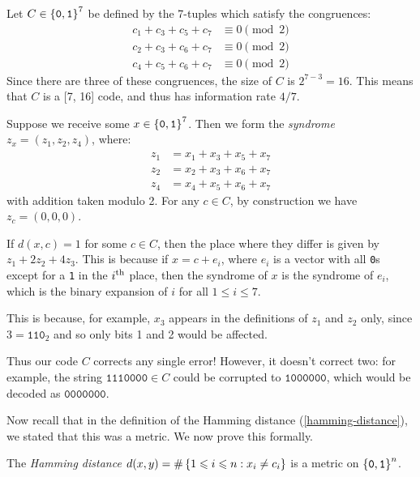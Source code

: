 \documentclass{article}
\begin{document}
\begin{example}
	\label{hammings-original-code}
    Let $C \in \left\lbrace \texttt{0}, \texttt{1} \right\rbrace^7$ be defined by the 7-tuples
    which satisfy the congruences:
    \begin{align*}
    	c_1 + c_3 + c_5 + c_7 &\equiv 0 \pmod 2 \\
    	c_2 + c_3 + c_6 + c_7 &\equiv 0 \pmod 2 \\
    	c_4 + c_5 + c_6 + c_7 &\equiv 0 \pmod 2
	\end{align*}
	Since there are three of these congruences,
	the size of $C$ is $2^{7-3} = 16$.
	This means that $C$ is a [7, 16] code,
	and thus has information rate $4/7$.
	
	Suppose we receive some $x \in \left\lbrace \texttt{0}, \texttt{1} \right\rbrace^7$.
	Then we form the \textit{syndrome} $z_x = (z_1, z_2, z_4)$, where:
	\begin{align*}
    	z_1 &= x_1 + x_3 + x_5 + x_7 \\
    	z_2 &= x_2 + x_3 + x_6 + x_7 \\
    	z_4 &= x_4 + x_5 + x_6 + x_7
	\end{align*}
	with addition taken modulo 2.
	For any $c \in C$, by construction we have $z_c = (0, 0, 0)$.
	
	If $d(x, c) = 1$ for some $c \in C$,
	then the place where they differ is given by $z_1 + 2z_2 + 4z_3$.
	This is because if $x = c + e_i$,
	where $e_i$ is a vector with all \texttt{0}s
	except for a \texttt{1} in the $i^{\text{th}}$ place,
	then the syndrome of $x$ is the syndrome of $e_i$,
	which is the binary expansion of $i$ for all $1 \leq i \leq 7$.
	
	This is because, for example,
	$x_3$ appears in the definitions of $z_1$ and $z_2$ only,
	since $3 = \texttt{110}_2$
	and so only bits 1 and 2 would be affected.
	
	Thus our code $C$ corrects any single error!
	However, it doesn't correct two:
	for example, the string $\texttt{1110000} \in C$
	could be corrupted to $\texttt{1000000}$,
	which would be decoded as $\texttt{0000000}$.
\end{example}

Now recall that in the definition of the Hamming distance (\ref{hamming-distance}),
we stated that this was a metric. We now prove this formally.

\begin{proposition}
    The \textit{Hamming distance}
    $d(x, y) = \#\left\lbrace 1 \leqslant i \leqslant n : x_i \neq c_i \right\rbrace$
    is a metric on $\left\lbrace \texttt{0}, \texttt{1} \right\rbrace^n$.
\end{proposition}
\end{document}
